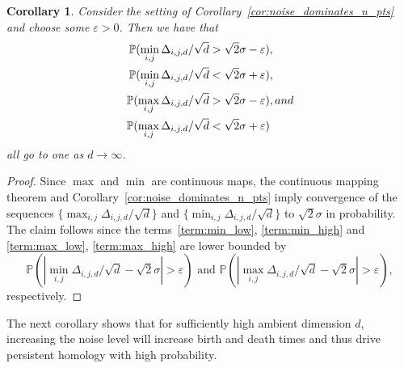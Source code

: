 \documentclass{article}
\theoremstyle{plain}
\newtheorem{corollary}[theorem]{Corollary}
\theoremstyle{definition}
\theoremstyle{remark}
\begin{document}
\begin{corollary}\label{cor:min_max_conv}
    Consider the setting of Corollary~\ref{cor:noise_dominates_n_pts} and choose some $\varepsilon >0$. Then we have that 
    \begin{align}
        \mathbb{P}(\min_{i,j} \Delta_{i,j,d}/\sqrt{d} &> \sqrt{2}\sigma -\varepsilon), \label{term:min_low} \\
        \mathbb{P}(\min_{i,j} \Delta_{i,j,d}/\sqrt{d} &< \sqrt{2}\sigma +\varepsilon), \label{term:min_high} \\
        \mathbb{P}(\max_{i,j} \Delta_{i,j,d}/\sqrt{d} &> \sqrt{2}\sigma -\varepsilon), \textnormal{ and }\label{term:max_low} \\
        \mathbb{P}(\max_{i,j} \Delta_{i,j,d}/\sqrt{d} &< \sqrt{2}\sigma +\varepsilon) \label{term:max_high}
    \end{align}
    all go to one as $d\to \infty$.
\end{corollary}
\begin{proof}
    Since $\max$ and $\min$ are continuous maps, the continuous mapping theorem and Corollary~\ref{cor:noise_dominates_n_pts} imply convergence of the sequences $\{\max_{i,j} \Delta_{i,j,d}/\sqrt{d}\}$ and $\{\min_{i,j} \Delta_{i,j,d}/\sqrt{d}\}$ to $\sqrt{2}\sigma$ in probability.
    The claim follows since the terms~\eqref{term:min_low}, \eqref{term:min_high} and \eqref{term:max_low}, \eqref{term:max_high} are lower bounded by 
    \begin{equation}
        \mathbb{P}(|\min_{i,j}\Delta_{i,j,d}/\sqrt{d} - \sqrt{2}\sigma| > \varepsilon) \text{ and }\mathbb{P}(|\max_{i,j} \Delta_{i,j,d}/\sqrt{d} - \sqrt{2}\sigma| > \varepsilon),
    \end{equation}
    respectively.
\end{proof}

The next corollary shows that for sufficiently high ambient dimension $d$, increasing the noise level will increase birth and death times and thus drive persistent homology with high probability.
\end{document}
